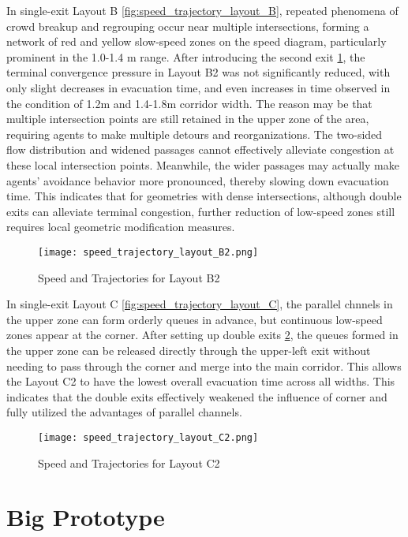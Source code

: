 In single-exit Layout B \ref{fig:speed_trajectory_layout_B}, repeated phenomena of crowd breakup and regrouping occur near multiple intersections, forming a network of red and yellow slow-speed zones on the speed diagram, particularly prominent in the 1.0-1.4 m range. After introducing the second exit \ref{fig:speed_trajectory_layout_B2}, the terminal convergence pressure in Layout B2 was not significantly reduced, with only slight decreases in evacuation time, and even increases in time observed in the condition of 1.2m and 1.4-1.8m corridor width. The reason may be that multiple intersection points are still retained in the upper zone of the area, requiring agents to make multiple detours and reorganizations. The two-sided flow distribution and widened passages cannot effectively alleviate congestion at these local intersection points. Meanwhile, the wider passages may actually make agents' avoidance behavior more pronounced, thereby slowing down evacuation time. This indicates that for geometries with dense intersections, although double exits can alleviate terminal congestion, further reduction of low-speed zones still requires local geometric modification measures.

\begin{figure}[h]
    \texttt{[image: speed\_trajectory\_layout\_B2.png]}
    \caption{Speed and Trajectories for Layout B2}\label{fig:speed_trajectory_layout_B2}
\end{figure}

In single-exit Layout C \ref{fig:speed_trajectory_layout_C}, the parallel chnnels in the upper zone can form orderly queues in advance, but continuous low-speed zones appear at the corner. After setting up double exits \ref{fig:speed_trajectory_layout_C2}, the queues formed in the upper zone can be released directly through the upper-left exit without needing to pass through the corner and merge into the main corridor. This allows the Layout C2 to have the lowest overall evacuation time across all widths. This indicates that the double exits effectively weakened the influence of corner and fully utilized the advantages of parallel channels.

\begin{figure}[h]
    \texttt{[image: speed\_trajectory\_layout\_C2.png]}
    \caption{Speed and Trajectories for Layout C2}\label{fig:speed_trajectory_layout_C2}
\end{figure}

\section{Big Prototype}

